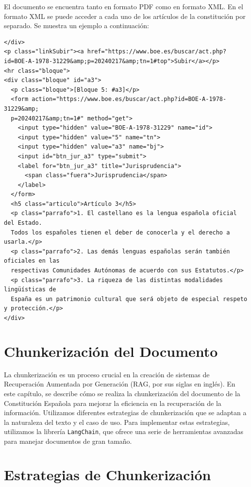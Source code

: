El documento se encuentra tanto en formato PDF como en formato XML. En el formato XML se puede acceder a cada uno de los artículos de la constitución por separado. Se muestra un ejemplo a continuación:

\begin{verbatim}
</div>
<p class="linkSubir"><a href="https://www.boe.es/buscar/act.php?
id=BOE-A-1978-31229&amp;p=20240217&amp;tn=1#top">Subir</a></p>
<hr class="bloque">
<div class="bloque" id="a3">
  <p class="bloque">[Bloque 5: #a3]</p>
  <form action="https://www.boe.es/buscar/act.php?id=BOE-A-1978-31229&amp;
  p=20240217&amp;tn=1#" method="get">
    <input type="hidden" value="BOE-A-1978-31229" name="id">
    <input type="hidden" value="5" name="tn">
    <input type="hidden" value="a3" name="bj">
    <input id="btn_jur_a3" type="submit">
    <label for="btn_jur_a3" title="Jurisprudencia">
      <span class="fuera">Jurisprudencia</span>
    </label>
  </form>
  <h5 class="articulo">Artículo 3</h5>
  <p class="parrafo">1. El castellano es la lengua española oficial del Estado. 
  Todos los españoles tienen el deber de conocerla y el derecho a usarla.</p>
  <p class="parrafo">2. Las demás lenguas españolas serán también oficiales en las 
  respectivas Comunidades Autónomas de acuerdo con sus Estatutos.</p>
  <p class="parrafo">3. La riqueza de las distintas modalidades lingüísticas de 
  España es un patrimonio cultural que será objeto de especial respeto y protección.</p>
</div>
\end{verbatim}

\section{Chunkerización del Documento}

La chunkerización es un proceso crucial en la creación de sistemas de Recuperación Aumentada por Generación (RAG, por sus siglas en inglés). En este capítulo, se describe cómo se realiza la chunkerización del documento de la Constitución Española para mejorar la eficiencia en la recuperación de la información. Utilizamos diferentes estrategias de chunkerización que se adaptan a la naturaleza del texto y el caso de uso. Para implementar estas estrategias, utilizamos la librería \texttt{LangChain}, que ofrece una serie de herramientas avanzadas para manejar documentos de gran tamaño.

\section{Estrategias de Chunkerización}

